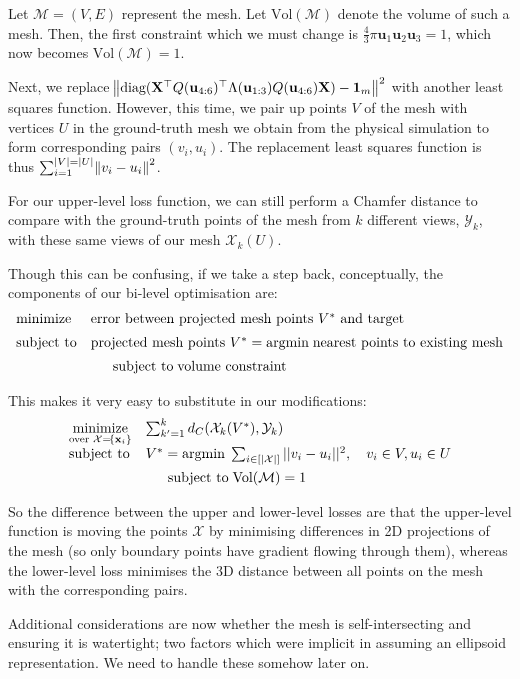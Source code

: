 \documentclass{article}
\begin{document}
Let $\mathcal M = (V,E)$ represent the mesh. Let $\text{Vol}(\mathcal M)$ denote the volume of such a mesh. Then, the first constraint which we must change is $\frac{4}{3} \pi \mathbf u_1 \mathbf u_2 \mathbf u_3 = 1$, which now becomes $\text{Vol}(\mathcal M) = 1$.

Next, we replace $\!\left\Vert \text{diag}(\mathbf X^\top Q(\mathbf u_{4:6}) ^\top \Lambda(\mathbf u_{1:3}) Q(\mathbf u_{4:6}) \mathbf X) - \mathbf 1_m \right\Vert ^2$ with another least squares function. However, this time, we pair up points $V$ of the mesh with vertices $U$ in the ground-truth mesh we obtain from the physical simulation to form corresponding pairs $(v_i, u_i)$. The replacement least squares function is thus $\sum_{i=1}^{|V| = |U|}\!\left\Vert v_i - u_i \right\Vert^2$. 

For our upper-level loss function, we can still perform a Chamfer distance to compare with the ground-truth points of the mesh from $k$ different views, $\mathcal Y_k$, with these same views of our mesh $\mathcal X_k(U)$.

Though this can be confusing, if we take a step back, conceptually, the components of our bi-level optimisation are:
$$
\begin{array}{ll}
    \underset{}{\text{minimize}} &  \text{error between projected mesh points $V^*$ and target} \\[0.5em]
  \text{subject to} & \text{projected mesh points } V^* = \text{argmin} \; \text{nearest points to existing mesh} \\[0.5em]
  & \hphantom{y =} \text{subject to} \;  \text{volume constraint}
\end{array}
$$

This makes it very easy to substitute in our modifications:
$$
\begin{array}{ll}
    \underset{\text{over } \mathcal X = \!\left\{ \mathbf x_i \right\} }{\text{minimize}} &  \sum_{k'=1}^k d_C(\mathcal X_k(V^*), \mathcal Y_k) \\[0.5em]
  \text{subject to} & V^* = \text{argmin} \; \sum_{i \in [|\mathcal X|]} ||v_i - u_i||^2, \quad v_i \in V, u_i \in U \\[0.5em]
  & \hphantom{y =} \text{subject to} \;  \text{Vol}(\mathcal M) = 1
\end{array}
$$

So the difference between the upper and lower-level losses are that the upper-level function is moving the points $\mathcal X$ by minimising differences in 2D projections of the mesh (so only boundary points have gradient flowing through them), whereas the lower-level loss minimises the 3D distance between all points on the mesh with the corresponding pairs.

Additional considerations are now whether the mesh is self-intersecting and ensuring it is watertight; two factors which were implicit in assuming an ellipsoid representation. We need to handle these somehow later on.
\end{document}
